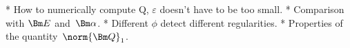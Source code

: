 
\Red

\begitems
* How to numerically compute Q, $\varepsilon$ doesn't have to be too small.
* Comparison with $\Bm E$ and~$\Bm\alpha$.
* Different $\phi$ detect different regularities.
* Properties of the quantity~$\norm{\Bm Q}_1$.
\enditems

\Black


